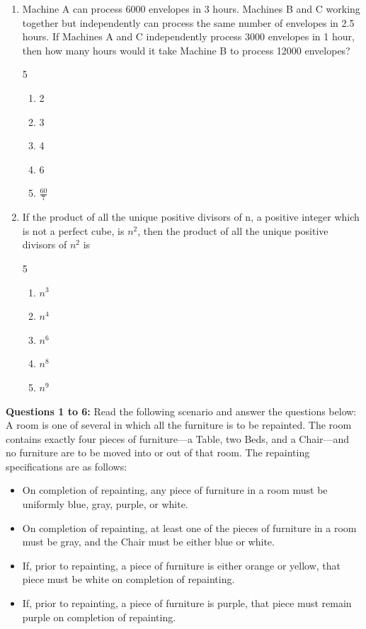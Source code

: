 \documentclass[12pt]{article}
\begin{document}
\begin{enumerate}
\item Machine A can process 6000 envelopes in 3 hours. Machines B and C working together but independently can process the same number of envelopes in 2.5 hours. If Machines A and C independently process 3000 envelopes in 1 hour, then how many hours would it take Machine B to process 12000 envelopes?
\begin{multicols}{5}
\begin{enumerate}[label=(\Alph*)]
\item 2
\item 3
\item 4
\item 6
\item $\frac{60}{7}$
\end{enumerate}
\end{multicols}

\item If the product of all the unique positive divisors of n, a positive integer which is not a perfect cube, is $n^2$, then the product of all the unique positive divisors of $n^2$ is
\begin{multicols}{5}
\begin{enumerate}[label=(\Alph*)]
\item $n^3$
\item $n^4$
\item $n^6$
\item $n^8$
\item $n^9$
\end{enumerate}
\end{multicols}

\end{enumerate}

\noindent
{} 
\hfill
{}


\noindent\textbf{Questions 1 to 6:} Read the following scenario and answer the questions below:\\[5pt]

A room is one of several in which all the furniture is to be repainted. The room contains exactly four pieces of furniture---a Table, two Beds, and a Chair---and no furniture are to be moved into or out of that room. The repainting specifications are as follows:\\[5pt]

\begin{itemize}
    \item On completion of repainting, any piece of furniture in a room must be uniformly blue, gray, purple, or white.
    \item On completion of repainting, at least one of the pieces of furniture in a room must be gray, and the Chair must be either blue or white.
    \item If, prior to repainting, a piece of furniture is either orange or yellow, that piece must be white on completion of repainting.
    \item If, prior to repainting, a piece of furniture is purple, that piece must remain purple on completion of repainting.
\end{itemize}
\end{document}
